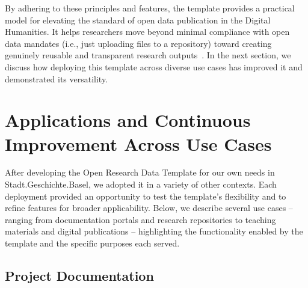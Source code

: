 \documentclass{anthology-ch}         %
\begin{document}
By adhering to these principles and features, the template provides a practical model for elevating the standard of open data publication in the Digital Humanities. It helps researchers move beyond minimal compliance with open data mandates (i.e., just uploading files to a repository) toward creating genuinely reusable and transparent research outputs~\cite{diekjobst2024a}. In the next section, we discuss how deploying this template across diverse use cases has improved it and demonstrated its versatility.

\section{Applications and Continuous Improvement Across Use Cases}\label{applications-and-continuous-improvement-across-use-cases}

After developing the Open Research Data Template for our own needs in Stadt.Geschichte.Basel, we adopted it in a variety of other contexts. Each deployment provided an opportunity to test the template's flexibility and to refine features for broader applicability. Below, we describe several use cases -- ranging from documentation portals and research repositories to teaching materials and digital publications -- highlighting the functionality enabled by the template and the specific purposes each served.

\subsection{Project Documentation}\label{project-documentation}
\end{document}

